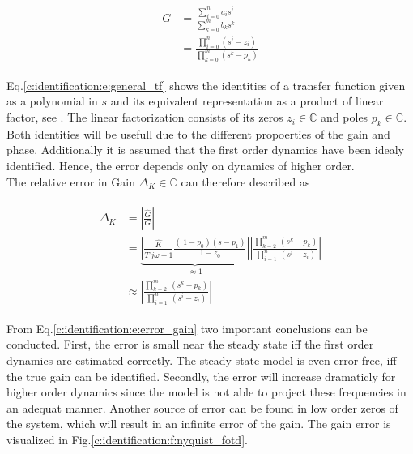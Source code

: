 \begin{align}
\begin{split}
G &=  \frac{\sum_{i=0}^n a_i s^i}{\sum_{k=0}^m b_k s^k} \\
&= \frac{\prod_{i=0}^n \left( s^i - z_i \right)}{\prod_{k=0}^m \left( s^k-p_k\right)} 
\end{split}
\label{c:identification:e:general_tf}
\end{align}

Eq.\ref{c:identification:e:general_tf} shows the identities of a transfer function given as a polynomial in $s$ and its equivalent representation as a product of linear factor, see \cite[p.269 ff.]{Lunze2016}. The linear factorization consists of its zeros $z_i \in \mathbb{C}$ and poles $p_k \in \mathbb{C}$. Both identities will be usefull due to the different propoerties of the gain and phase. Additionally it is assumed that the first order dynamics have been idealy identified. Hence, the error depends only on dynamics of higher order.\\

The relative error in Gain $\Delta_K \in \mathbb{C}$ can therefore described as

\begin{align}
\begin{split}
\Delta_K &= \left| \frac{\hat{G}}{G}\right| \\
&= \underbrace{\left|\frac{\hat{K}}{\hat{T}~j\omega+1} \frac{\left(\ 1-p_0 \right)\left( s- p_1 \right)}{1-z_0} \right|}_{\approx 1} \left| \frac{\prod_{k=2}^m~(s^k-p_k)}{\prod_{i=1}^n~(s^i-z_i)} \right| \\
&\approx \left| \frac{\prod_{k=2}^m~(s^k-p_k)}{\prod_{i=1}^n~(s^i-z_i)} \right|
\end{split}
\label{c:identification:e:error_gain}
\end{align}

From Eq.\ref{c:identification:e:error_gain} two important conclusions can be conducted. First, the error is small near the steady state iff the first order dynamics are estimated correctly. The steady state model is even error free, iff the true gain can be identified. Secondly, the error will increase dramaticly for higher order dynamics since the model is not able to project these frequencies in an adequat manner. Another source of error can be found in low order zeros of the system, which will result in an infinite error of the gain. The gain error is visualized in Fig.\ref{c:identification:f:nyquist_fotd}. \\

